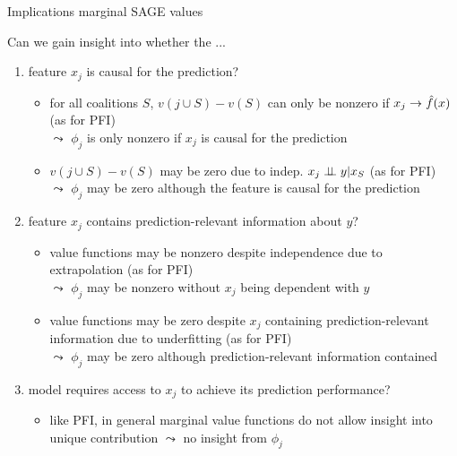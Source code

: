 \documentclass[10pt,compress,t,notes=noshow, xcolor=table]{beamer}
\begin{document}
\begin{frame}{Implications marginal SAGE values}

Can we gain insight into whether the ...

\begin{enumerate}
    \item<1> feature $x_j$ is causal for the prediction?    \begin{itemize}
      \item for all coalitions $S$, $v(j \cup S) - v(S)$ can only be nonzero if $x_j \rightarrow \hat{f}(x)$ (as for PFI)\\
      $\leadsto$ $\phi_j$ is only nonzero if $x_j$ is causal for the prediction
      \item $v(j \cup S) - v(S)$ may be zero due to indep. $x_j \perp \!\!\! \perp y | x_S$ (as for PFI)\\
      $\leadsto$ $\phi_j$ may be zero although the feature is causal for the prediction
    \end{itemize}
    \item<2> feature $x_j$ contains prediction-relevant information about $y$?
    \begin{itemize}
      \item value functions may be nonzero despite independence due to extrapolation (as for PFI)\\
      $\leadsto$ $\phi_j$ may be nonzero without $x_j$ being dependent with $y$
      \item value functions may be zero despite $x_j$ containing prediction-relevant information due to underfitting (as for PFI)\\
      $\leadsto$ $\phi_j$ may be zero although prediction-relevant information contained
    \end{itemize}
    \item<3> model requires access to $x_j$ to achieve its prediction performance?    
    \begin{itemize}
      \item like PFI, in general marginal value functions do not allow insight into unique contribution $\leadsto$ no insight from $\phi_j$
    \end{itemize}
\end{enumerate}

\end{frame}
%
\end{document}
